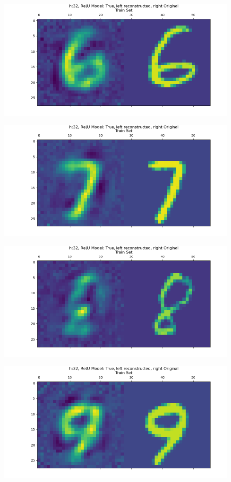 \documentclass[]{article}
\begin{document}
            \begin{center}
                \includegraphics*[width=12cm]{A4plots/06-50-24-h-32-nonlin-digit-6.png}
            \end{center}  
            \begin{center}
                \includegraphics*[width=12cm]{A4plots/06-50-24-h-32-nonlin-digit-7.png}
            \end{center}  
            \begin{center}
                \includegraphics*[width=12cm]{A4plots/06-50-24-h-32-nonlin-digit-8.png}
            \end{center}  
            \begin{center}
                \includegraphics*[width=12cm]{A4plots/06-50-24-h-32-nonlin-digit-9.png}
            \end{center}            
\end{document}
